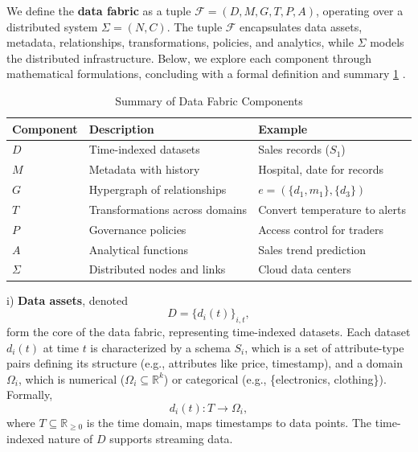 \documentclass{amsart}
\newcommand\R{\mathbb R}
\newcommand\cF{\mathcal{F}}
\begin{document}
We define the \textbf{data fabric} as a tuple \( \cF = (D, M, G, T, P, A) \), operating over a distributed system \( \Sigma = (N, C) \). The tuple \( \cF \) encapsulates 
%
data assets, metadata, relationships, transformations, policies, and analytics, while \( \Sigma \) models the distributed infrastructure. Below, we explore each component through mathematical formulations, concluding with a formal definition and summary  \cref{tab:components} .

\begin{table}[ht]
    \centering
    \begin{tabular}{l l l}
        \hline
        \textbf{Component} & \textbf{Description} & \textbf{Example} \\
        \hline
        \( D \) & Time-indexed datasets & Sales records (\( S_1 \)) \\
        \( M \) & Metadata with history & Hospital, date for records \\
        \( G \) & Hypergraph of relationships & \( e = (\{d_1, m_1\}, \{d_3\}) \) \\
        \( T \) & Transformations across domains & Convert temperature to alerts \\
        \( P \) & Governance policies & Access control for traders \\
        \( A \) & Analytical functions & Sales trend prediction \\
        \( \Sigma \) & Distributed nodes and links & Cloud data centers \\
        \hline
    \end{tabular}
    \caption{Summary of Data Fabric Components}
    \label{tab:components}
\end{table}


i) \textbf{Data assets}, denoted 
%
\begin{equation}\label{subsec:data_assets}
 D = \{d_i(t)\}_{i,t},
 \end{equation}
  form the core of the data fabric, representing time-indexed datasets. Each dataset \( d_i(t) \) at time \( t \) is characterized by a schema \( S_i \), which is a set of attribute-type pairs defining its structure (e.g., attributes like price, timestamp), and a domain \( \Omega_i \), which is numerical (\( \Omega_i \subseteq \R^k \)) or categorical (e.g., \{electronics, clothing\}). Formally, 
 \[
   d_i(t): T \to \Omega_i,
 \]
%
    where \( T \subseteq \R_{\geq 0} \) is the time domain, maps timestamps to data points.
%
The time-indexed nature of \( D \) supports streaming data.
\end{document}
